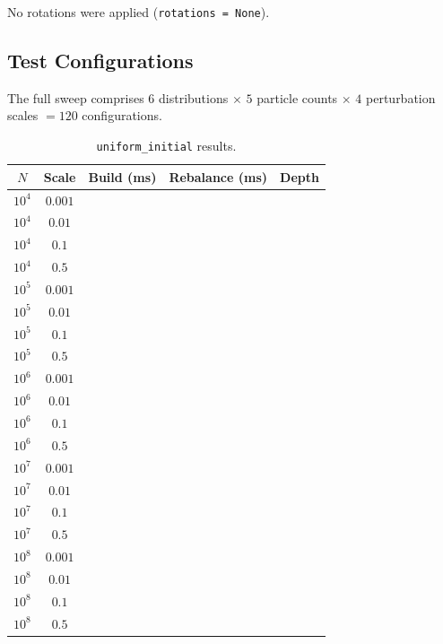 No rotations were applied (\texttt{rotations = None}).

\subsection{Test Configurations}

The full sweep comprises $6$ distributions $\times$ $5$ particle counts $\times$ $4$ perturbation scales $= 120$ configurations.

\begin{table}[ht]
    \centering
    \caption{\texttt{uniform\_initial} results.}
    \label{tab:uniform_results}
    \begin{tabular}{|c|c|c|c|c|}
        \hline
        \textbf{$N$} & \textbf{Scale} & \textbf{Build (ms)} & \textbf{Rebalance (ms)} & \textbf{Depth} \\
        \hline
        $10^4$ & $0.001$ & & & \\
        $10^4$ & $0.01$  & & & \\
        $10^4$ & $0.1$   & & & \\
        $10^4$ & $0.5$   & & & \\
        \hline
        $10^5$ & $0.001$ & & & \\
        $10^5$ & $0.01$  & & & \\
        $10^5$ & $0.1$   & & & \\
        $10^5$ & $0.5$   & & & \\
        \hline
        $10^6$ & $0.001$ & & & \\
        $10^6$ & $0.01$  & & & \\
        $10^6$ & $0.1$   & & & \\
        $10^6$ & $0.5$   & & & \\
        \hline
        $10^7$ & $0.001$ & & & \\
        $10^7$ & $0.01$  & & & \\
        $10^7$ & $0.1$   & & & \\
        $10^7$ & $0.5$   & & & \\
        \hline
        $10^8$ & $0.001$ & & & \\
        $10^8$ & $0.01$  & & & \\
        $10^8$ & $0.1$   & & & \\
        $10^8$ & $0.5$   & & & \\
        \hline
    \end{tabular}
\end{table}

